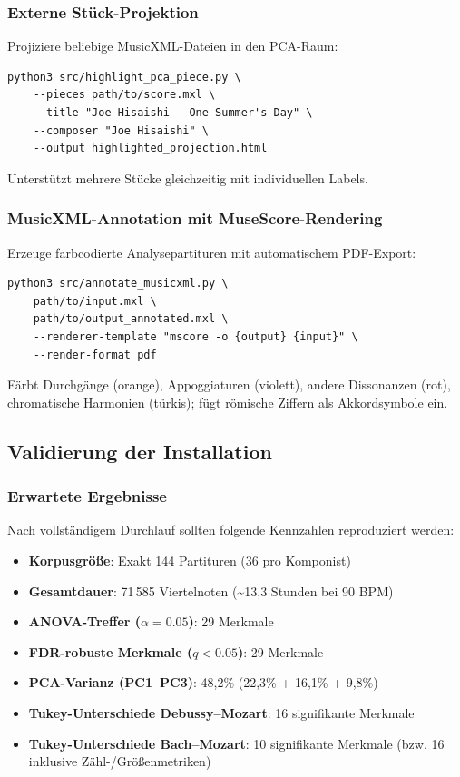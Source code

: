 \documentclass[12pt,a4paper]{article}
\theoremstyle{definition}
\begin{document}
\subsubsection{Externe Stück-Projektion}

Projiziere beliebige MusicXML-Dateien in den PCA-Raum:
\begin{lstlisting}
python3 src/highlight_pca_piece.py \
    --pieces path/to/score.mxl \
    --title "Joe Hisaishi - One Summer's Day" \
    --composer "Joe Hisaishi" \
    --output highlighted_projection.html
\end{lstlisting}
Unterstützt mehrere Stücke gleichzeitig mit individuellen Labels.

\subsubsection{MusicXML-Annotation mit MuseScore-Rendering}

Erzeuge farbcodierte Analysepartituren mit automatischem PDF-Export:
\begin{lstlisting}
python3 src/annotate_musicxml.py \
    path/to/input.mxl \
    path/to/output_annotated.mxl \
    --renderer-template "mscore -o {output} {input}" \
    --render-format pdf
\end{lstlisting}
Färbt Durchgänge (orange), Appoggiaturen (violett), andere Dissonanzen (rot), chromatische Harmonien (türkis); fügt römische Ziffern als Akkordsymbole ein.

\subsection{Validierung der Installation}

\subsubsection{Erwartete Ergebnisse}

Nach vollständigem Durchlauf sollten folgende Kennzahlen reproduziert werden:
\begin{itemize}
    \item \textbf{Korpusgröße}: Exakt 144 Partituren (36 pro Komponist)
    \item \textbf{Gesamtdauer}: 71\,585 Viertelnoten (\textasciitilde13,3 Stunden bei 90 BPM)
    \item \textbf{ANOVA-Treffer ($\alpha=0.05$)}: 29 Merkmale
    \item \textbf{FDR-robuste Merkmale ($q<0.05$)}: 29 Merkmale
    \item \textbf{PCA-Varianz (PC1--PC3)}: 48,2\% (22,3\% + 16,1\% + 9,8\%)
    \item \textbf{Tukey-Unterschiede Debussy--Mozart}: 16 signifikante Merkmale
    \item \textbf{Tukey-Unterschiede Bach--Mozart}: 10 signifikante Merkmale (bzw. 16 inklusive Zähl-/Größenmetriken)
\end{itemize}
\end{document}
